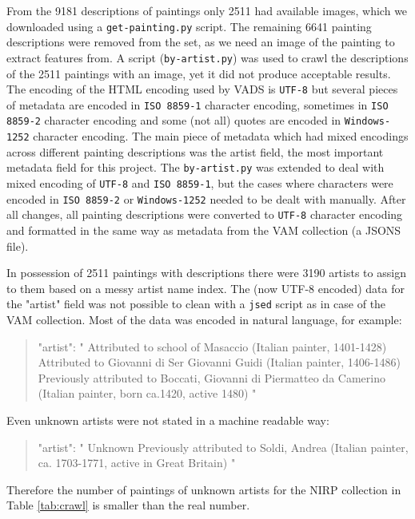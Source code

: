 \documentclass[11pt,a4paper,twoside,openright,draft]{report}
\begin{document}
\begin{multicols}{2}
From the 9181 descriptions of paintings only 2511 had available images, which
we downloaded using a \texttt{get-painting.py} script.  The remaining 6641
painting descriptions were removed from the set, as we need an image of the
painting to extract features from.  A script (\texttt{by-artist.py}) was used
to crawl the descriptions of the 2511 paintings with an image, yet it did not
produce acceptable results.  The encoding of the HTML encoding used by VADS is
\texttt{UTF-8} but several pieces of metadata are encoded in \texttt{ISO
8859-1} character encoding, sometimes in \texttt{ISO 8859-2} character encoding
and some (not all) quotes are encoded in \texttt{Windows-1252} character
encoding.  The main piece of metadata which had mixed encodings across
different painting descriptions was the artist field, the most important
metadata field for this project.  The \texttt{by-artist.py} was extended to
deal with mixed encoding of \texttt{UTF-8} and \texttt{ISO 8859-1}, but the
cases where characters were encoded in \texttt{ISO 8859-2} or
\texttt{Windows-1252} needed to be dealt with manually.  After all changes, all
painting descriptions were converted to \texttt{UTF-8} character encoding and
formatted in the same way as metadata from the VAM collection (a JSONS file).

In possession of 2511 paintings with descriptions there were 3190 artists to
assign to them based on a messy artist name index.  The (now UTF-8 encoded)
data for the "artist" field was not possible to clean with a \texttt{jsed}
script as in case of the VAM collection.  Most of the data was encoded in
natural language, for example:

\begin{quote}
"artist": " Attributed to school of Masaccio (Italian painter, 1401-1428)
Attributed to Giovanni di Ser Giovanni Guidi (Italian painter, 1406-1486)
Previously attributed to Boccati, Giovanni di Piermatteo da Camerino (Italian
painter, born ca.1420, active 1480) "
\end{quote}

Even unknown artists were not stated in a machine readable way:

\begin{quote}
"artist": " Unknown  Previously attributed to Soldi, Andrea (Italian painter,
ca.  1703-1771, active in Great Britain) "
\end{quote}

Therefore the number of paintings of unknown artists for the NIRP collection in
Table \ref{tab:crawl} is smaller than the real number.


\end{multicols}
\end{document}
